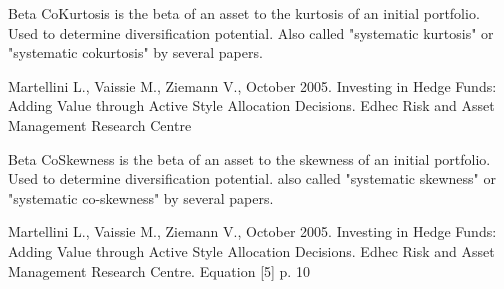 \documentclass[12pt,letterpaper,english]{article}
\begin{document}
\begin{Description}\relax
Beta CoKurtosis is the beta of an asset to the kurtosis of an initial portfolio.  Used to determine diversification potential.
Also called "systematic kurtosis" or "systematic cokurtosis" by several papers.
\end{Description}
\begin{Details}\relax
{}
\end{Details}
\begin{References}\relax
Martellini L., Vaissie M., Ziemann V., October 2005. Investing in Hedge Funds: Adding Value through Active Style Allocation Decisions. Edhec Risk and Asset Management Research Centre
\end{References}


\begin{Description}\relax
Beta CoSkewness is the beta of an asset to the skewness of an initial portfolio.  Used to determine diversification potential. also called "systematic skewness" or "systematic co-skewness" by several papers.
\end{Description}
\begin{Details}\relax
{}
\end{Details}
\begin{References}\relax
Martellini L., Vaissie M., Ziemann V., October 2005. Investing in Hedge Funds: Adding Value through Active Style Allocation Decisions. Edhec Risk and Asset Management Research Centre. Equation [5] p. 10
\end{References}


\begin{Examples}
\end{Examples}
\end{document}
